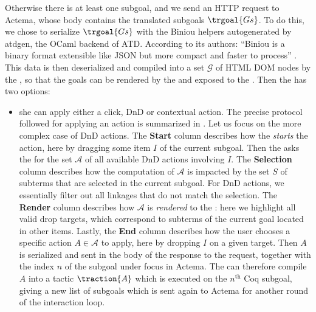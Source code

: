 Otherwise there is at least one subgoal, and we send an  HTTP
request to Actema, whose body contains the translated subgoals $\trgoal{Gs}$. To
do this, we chose to serialize $\trgoal{Gs}$ with the Biniou helpers
autogenerated by atdgen, the OCaml backend of ATD. According to its authors:
``Biniou is a binary format extensible like JSON but more compact and faster to
process'' . This data is then deserialized and compiled into a
set $\mathcal{G}$ of HTML DOM nodes by the , so that the goals
can be rendered by the  and exposed to the .
Then the  has two options:
\begin{itemize}
  \item she can apply either a click, DnD or contextual action. The precise protocol followed for applying an action is
  summarized in . Let us focus on the more complex case
  of DnD actions. The \textbf{Start} column describes how the 
  \emph{starts} the action, here by dragging some item $I$ of the current
  subgoal. Then the  asks the  for the set
  $\mathcal{A}$ of all available DnD actions involving $I$. The
  \textbf{Selection} column describes how the computation of $\mathcal{A}$ is
  impacted by the set $S$ of subterms that are selected in the current subgoal.
  For DnD actions, we essentially filter out all linkages that do not match the
  selection. The \textbf{Render} column describes how $\mathcal{A}$ is
  \emph{rendered} to the : here we highlight all valid drop
  targets, which correspond to subterms of the current goal located in other
  items. Lastly, the \textbf{End} column describes how
  the user chooses a specific action $A \in \mathcal{A}$ to apply, here by
  dropping $I$ on a given target. Then $A$ is serialized and sent in the body of
  the response to the  request, together with the index $n$ of
  the subgoal under focus in Actema. The  can therefore compile
  $A$ into a tactic $\traction{A}$ which is executed on the $n^{\text{th}}$ Coq
  subgoal, giving a new list of subgoals which is sent again to Actema for
  another round of the interaction loop.


\end{itemize}
